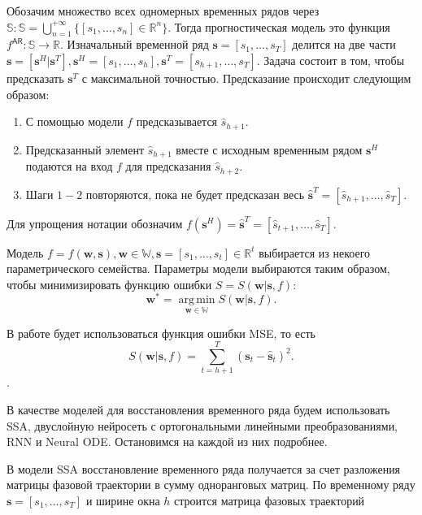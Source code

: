 \documentclass[12pt, twoside]{article}
\DeclareMathOperator*{\argmin}{arg\,min}
\begin{document}
Обозачим множество всех одномерных временных рядов через $\mathbb{S}: \mathbb{S} = \bigcup\limits_{n=1}^{+\infty}\{[s_1, \dots, s_n] \in \mathbb{R}^{n}\}$. Тогда прогностическая модель это функция $f^{\mathsf{AR}}: \mathbb{S} \to \mathbb{R}$. Изначальный временной ряд $\mathbf{s} = [s_1, \dots, s_T]$ делится на две части $\mathbf{s} = [\mathbf{s}^H|\mathbf{s}^T], \mathbf{s}^H = [s_1, \dots, s_h], \mathbf{s}^T = [s_{h+1}, \dots, s_T]$. Задача состоит в том, чтобы предсказать $\mathbf{s}^T$ с максимальной точностью. Предсказание происходит следующим образом:

\begin{enumerate}
    \item С помощью модели $f$ предсказывается $\hat{s}_{h+1}$.
    \item Предсказанный элемент $\hat{s}_{h+1}$ вместе с исходным временным рядом $\mathbf{s}^H$ подаются на вход $f$ для предсказания $\hat{s}_{h+2}$.
    \item Шаги $1-2$ повторяются, пока не будет предсказан весь $\hat{\mathbf{s}}^T=[\hat{s}_{h+1}, \dots, \hat{s}_{T}]$.
\end{enumerate}

Для упрощения нотации обозначим $f(\mathbf{s}^H)=\hat{\mathbf{s}}^T = [\hat{s}_{t+1}, \dots, \hat{s}_{T}]$.

Модель $f = f(\mathbf{w}, \mathbf{s}), \mathbf{w} \in \mathbb{W}, \mathbf{s}=[s_1, \dots, s_t]\in \mathbb{R}^t$ выбирается из некоего параметрического семейства.
Параметры модели выбираются таким образом, чтобы минимизировать функцию ошибки $S=S(\mathbf{w}|\mathbf{s},f)$:
$$
\mathbf{w^*} = \argmin\limits_{\mathbf{w} \in \mathbb{W}} S(\mathbf{w}|\mathbf{s},f).
$$


В работе будет использоваться функция ошибки MSE, то есть 
$$
S(\mathbf{w}|\mathbf{s},f) = \sum\limits_{t=h+1}^{T}(\mathbf{s}_t - \hat{\mathbf{s}}_t)^2.
$$.


В качестве моделей для восстановления временного ряда будем использовать SSA, двуслойную нейросеть с ортогональными линейными преобразованиями, RNN и Neural ODE. Остановимся на каждой из них подробнее.

В модели SSA восстановление временного ряда получается за счет разложения матрицы фазовой траектории в сумму одноранговых матриц. По временному ряду $\mathbf{s} = [s_1, \dots, s_{T}]$ и ширине окна $h$ строится матрица фазовых траекторий 
\end{document}
